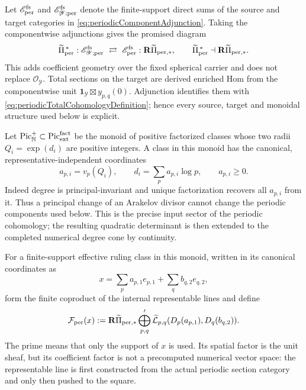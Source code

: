 \documentclass[11pt]{amsart}
\theoremstyle{definition}
\theoremstyle{remark}
\newcommand{\Pic}{\operatorname{Pic}}
\begin{document}
Let $\mathscr E_{\rm per}^{\rm fs}$ and
$\mathscr E_{\mathscr Y;\rm per}^{\rm fs}$ denote the finite-support direct
sums of the source and target categories in
\eqref{eq:periodicComponentAdjunction}.  Taking the componentwise adjunctions
gives the promised diagram
\begin{equation}\label{eq:periodicCoefficientProjection}
 \widetilde\Pi_{\rm per}^{\,*}:
 \mathscr E_{\mathscr Y;\rm per}^{\rm fs}
 \ \rightleftarrows\
 \mathscr E_{\rm per}^{\rm fs}:
 \mathbf R\widetilde\Pi_{{\rm per},*},
 \qquad
 \widetilde\Pi_{\rm per}^{\,*}\dashv
 \mathbf R\widetilde\Pi_{{\rm per},*}.
\end{equation}
This adds coefficient geometry over the fixed spherical carrier and does
not replace $\mathcal O_{\mathscr Y}$.  Total sections on the target are
derived enriched Hom from the componentwise unit
$\mathbf1_{\mathscr Y}\boxtimes y_{p,q}(0)$.  Adjunction identifies them
with \eqref{eq:periodicTotalCohomologyDefinition}; hence every source,
target and monoidal structure used below is explicit.

Let $\Pic_{\mathbb N}^{+}\subset\Pic_{\rm ext}^{\rm fact}$ be the monoid of
positive factorized classes whose two radii
$Q_i=\exp(d_i)$ are positive integers.  A class in this monoid has the
canonical, representative-independent coordinates
\begin{equation}\label{eq:canonicalPrimeCoordinates}
 a_{p,i}=v_p(Q_i),\qquad
 d_i=\sum_p a_{p,i}\log p,\qquad a_{p,i}\geq0.
\end{equation}
Indeed degree is principal-invariant and unique factorization recovers all
$a_{p,i}$ from it.  Thus a principal change of an Arakelov divisor cannot
change the periodic components used below.  This is the precise input
sector of the periodic cohomology; the resulting quadratic determinant is
then extended to the completed numerical degree cone by continuity.

For a finite-support effective ruling class in this monoid, written in its
canonical coordinates as
\[
 x=\sum_p a_{p,1}e_{p,1}+\sum_qb_{q,2}e_{q,2},
\]
form the finite coproduct of the internal representable lines and define
\begin{equation}\label{eq:intrinsicCoefficientObject}
 \mathcal F_{\rm per}(x)
 :=\mathbf R\widetilde\Pi_{{\rm per},*}
    \bigoplus_{p,q}'\widetilde{\mathcal L}_{p,q}
          (D_p(a_{p,1}),D_q(b_{q,2})).
\end{equation}
The prime means that only the support of $x$ is used.  Its spatial factor is
the unit sheaf, but its coefficient factor is not a precomputed numerical
vector space: the representable line is first constructed from the actual
periodic section category and only then pushed to the square.
\end{document}
